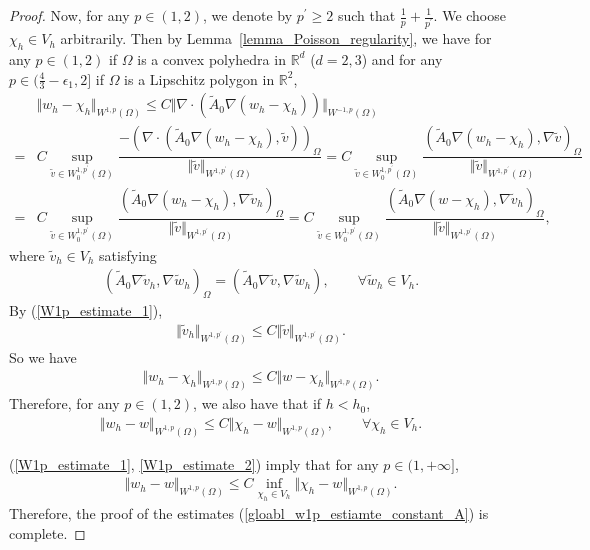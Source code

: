 \documentclass[12pt]{amsart}
\theoremstyle{definition}
\theoremstyle{remark}
\begin{document}
\begin{proof}
Now, for any $p \in (1,2)$, we denote by $p^{\prime} \geq 2$ such that $\frac{1}{p} + \frac{1}{p^{\prime}}$. We choose $\chi_{h} \in V_{h}$ arbitrarily. 
Then by Lemma~\ref{lemma_Poisson_regularity}, 
we have for any $p \in (1,2)$ if $\Omega$ is a convex polyhedra in $\mathbb{R}^{d}$ 
($d=2,3$) and for any $p \in (\frac{4}{3}-\epsilon_{1},2]$ if $\Omega$ is a 
Lipschitz polygon in $\mathbb{R}^{2}$,
\begin{align*}
& \Vert w_{h} - \chi_{h}\Vert_{W^{1,p}(\Omega)} 
\leq C \Vert \nabla \cdot ( \tilde{A}_{0}\nabla (w_{h} 
- \chi_{h}) ) \Vert_{W^{-1,p}(\Omega)} \\
= & C \sup_{\tilde{v} \in W_{0}^{1,p^{\prime}}(\Omega)} \dfrac{-( \nabla \cdot ( \tilde{A}_{0}\nabla (w_{h} - \chi_{h}), \tilde{v}))_{\Omega}}
{\Vert \tilde{v}\Vert_{W^{1,p^{\prime}}(\Omega)}}
= C \sup_{\tilde{v} \in W_{0}^{1,p^{\prime}}(\Omega)} \dfrac{( \tilde{A}_{0}\nabla (w_{h} - \chi_{h}), \nabla \tilde{v})_{\Omega}}
{\Vert \tilde{v}\Vert_{W^{1,p^{\prime}}(\Omega)}} \\
= & C \sup_{\tilde{v} \in W_{0}^{1,p^{\prime}}(\Omega)} \dfrac{( \tilde{A}_{0}\nabla (w_{h} - \chi_{h}), \nabla \tilde{v}_{h})_{\Omega}}
{\Vert \tilde{v}\Vert_{W^{1,p^{\prime}}(\Omega)}} 
= C \sup_{\tilde{v} \in W_{0}^{1,p^{\prime}}(\Omega)} \dfrac{( \tilde{A}_{0}\nabla 
(w - \chi_{h}), \nabla \tilde{v}_{h})_{\Omega}}
{\Vert \tilde{v}\Vert_{W^{1,p^{\prime}}(\Omega)}},
\end{align*}
where $\tilde{v}_{h} \in V_{h}$ satisfying 
\begin{align*}
(\tilde{A}_{0}\nabla \tilde{v}_{h}, \nabla \tilde{w}_{h})_{\Omega} = (\tilde{A}_{0}\nabla \tilde{v}, \nabla \tilde{w}_{h}), 
\qquad \forall \tilde{w}_{h} \in V_{h}.
\end{align*}
By (\ref{W1p_estimate_1}), 
\begin{align*}
\Vert \tilde{v}_{h}\Vert_{W^{1,p^{\prime}}(\Omega)} \leq C \Vert \tilde{v}\Vert_{W^{1,p^{\prime}}(\Omega)}.
\end{align*}
So we have 
\begin{align*}
\Vert w_{h}  - \chi_{h}\Vert_{W^{1,p}(\Omega)} \leq C 
\Vert w - \chi_{h}\Vert_{W^{1,p}(\Omega)}.
\end{align*}
Therefore, for any $p \in (1,2)$, we also have 
that if $h<h_{0}$,
\begin{align}
\label{W1p_estimate_2}
\Vert w_{h} - w \Vert_{W^{1,p}(\Omega)} \leq C \Vert \chi_{h} - w \Vert_{W^{1,p}(\Omega)}, 
\qquad \forall \chi_{h} \in V_{h}.
\end{align}

(\ref{W1p_estimate_1}, \ref{W1p_estimate_2}) imply that for any $p\in (1,+\infty]$, 
\begin{align*}
\Vert w_{h} - w \Vert_{W^{1,p}(\Omega)} \leq C \inf_{\chi_{h}\in V_{h}} 
\Vert \chi_{h} - w \Vert_{W^{1,p}(\Omega)}.
\end{align*}
Therefore, the proof of the estimates (\ref{gloabl_w1p_estiamte_constant_A}) is complete.
\end{proof}
\end{document}
